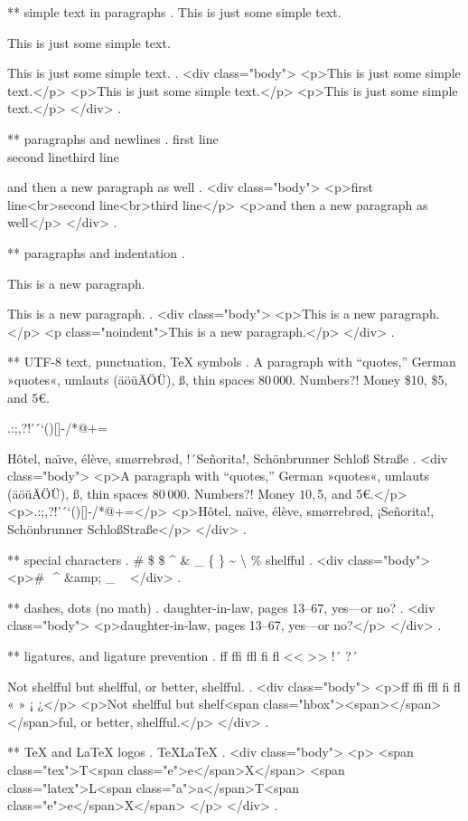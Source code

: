 ** simple text in paragraphs
.
This is just some simple text.

This is just some simple text.

This is just some simple text.
.
<div class="body">
<p>This is just some simple text.</p>
<p>This is just some simple text.</p>
<p>This is just some simple text.</p>
</div>
.


** paragraphs and newlines
.
first line\\second line\newline third line\par and then a new paragraph as well
.
<div class="body">
<p>ﬁrst line<br>second line<br>third line</p>
<p>and then a new paragraph as well</p>
</div>
.


** paragraphs and indentation
.
\noindent

\noindent

This is a new paragraph.

\noindent
This is a new paragraph.
.
<div class="body">
<p>This is a new paragraph.</p>
<p class="noindent">This is a new paragraph.</p>
</div>
.


** UTF-8 text, punctuation, TeX symbols
.
A para\-graph with “quotes,” German »quotes«, umlauts (äöüÄÖÜ), ß, thin spaces 80\,000. Numbers?! Money \$10, \$5, and 5€.

.:;,?!'´`()[]-/*@+=

H\^otel, na\"\i ve, \'el\`eve, sm\o rrebr\o d, !´Se\~norita!, Sch\"onbrunner Schlo\ss{} Stra\ss e
.
<div class="body">
<p>A para­graph with “quotes,” German »quotes«, umlauts (äöüÄÖÜ), ß, thin spaces 80 000. Numbers?! Money $10, $5, and 5€.</p>
<p>.:;,?!’´‘()[]‐/*@+=</p>
<p>Hôtel, naı̈ve, élève, smørrebrød, ¡Señorita!, Schönbrunner Schloß​ Straße</p>
</div>
.


** special characters
.
\# \$ \$ \^{} \& \_ \{ \} \~{} \textbackslash{} \% shelf\-ful
.
<div class="body">
<p># $ $ ^​ &amp; _ { } ~​ \​ %
</div>
.


** dashes, dots (no math)
.
daughter-in-law, pages 13--67, yes---or no?
.
<div class="body">
<p>daughter‐in‐law, pages 13–67, yes—or no?</p>
</div>
.


** ligatures, and ligature prevention
.
ff ffi ffl fi fl << >> !´ ?´

Not shelfful but shelf\mbox{}ful, or better, shelf\/ful.
.
<div class="body">
<p>ﬀ ﬃ ﬄ ﬁ ﬂ « » ¡ ¿</p>
<p>Not shelﬀul but shelf<span class="hbox"><span></span></span>ful, or better, shelf‌ful.</p>
</div>
.


** TeX and LaTeX logos
.
\TeX \LaTeX
.
<div class="body">
<p>
<span class="tex">T<span class="e">e</span>X</span>
<span class="latex">L<span class="a">a</span>T<span class="e">e</span>X</span>
</p>
</div>
.


